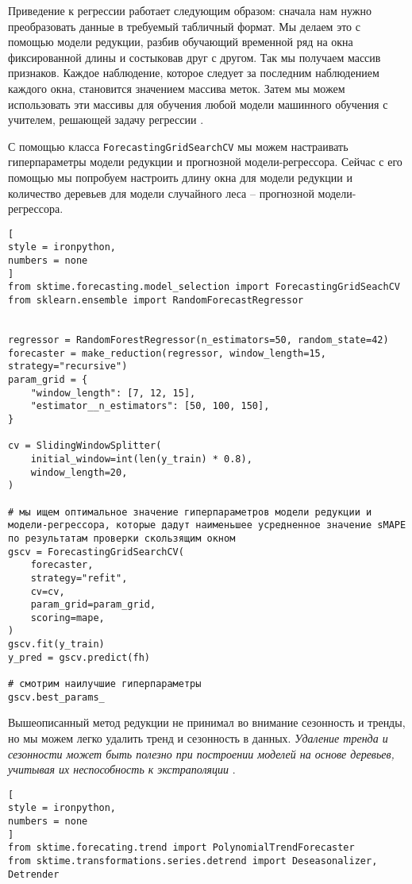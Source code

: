 \documentclass[%
	11pt,
	a4paper,
	utf8,
		]{article}
\begin{document}
Приведение к регрессии работает следующим образом: сначала нам нужно преобразовать данные в требуемый табличный формат. Мы делаем это с помощью модели редукции, разбив обучающий временной ряд на окна фиксированной длины и состыковав друг с другом. Так мы получаем массив признаков. Каждое наблюдение, которое следует за последним наблюдением каждого окна, становится значением массива меток. Затем мы можем использовать эти массивы для обучения любой модели машинного обучения с учителем, решающей задачу регрессии \cite[]{gruzdev:time-series-2022}.

С помощью класса \verb|ForecastingGridSearchCV| мы можем настраивать гиперпараметры модели редукции и прогнозной модели-регрессора. Сейчас с его помощью мы попробуем настроить длину окна для модели редукции и количество деревьев для модели случайного леса -- прогнозной модели-регрессора.
\begin{lstlisting}[
style = ironpython,
numbers = none
]
from sktime.forecasting.model_selection import ForecastingGridSeachCV
from sklearn.ensemble import RandomForecastRegressor


regressor = RandomForestRegressor(n_estimators=50, random_state=42)
forecaster = make_reduction(regressor, window_length=15, strategy="recursive")
param_grid = {
    "window_length": [7, 12, 15],
    "estimator__n_estimators": [50, 100, 150],
}

cv = SlidingWindowSplitter(
    initial_window=int(len(y_train) * 0.8),
    window_length=20,
)

# мы ищем оптимальное значение гиперпараметров модели редукции и модели-регрессора, которые дадут наименьшее усредненное значение sMAPE по результатам проверки скользящим окном
gscv = ForecastingGridSearchCV(
    forecaster,
    strategy="refit",
    cv=cv,
    param_grid=param_grid,
    scoring=mape,
)
gscv.fit(y_train)
y_pred = gscv.predict(fh)

# смотрим наилучшие гиперпараметры
gscv.best_params_
\end{lstlisting}

Вышеописанный метод редукции не принимал во внимание сезонность и тренды, но мы можем легко удалить тренд и сезонность в данных. \emph{\color{blue}Удаление тренда и сезонности может быть полезно при построении моделей на основе деревьев, учитывая их неспособность к экстраполяции }\cite[]{gruzdev:time-series-2022}.
\begin{lstlisting}[
style = ironpython,
numbers = none
]
from sktime.forecating.trend import PolynomialTrendForecaster
from sktime.transformations.series.detrend import Deseasonalizer, Detrender
\end{lstlisting}
\end{document}

